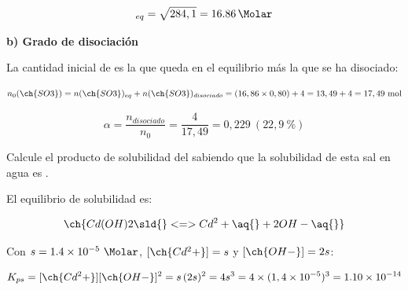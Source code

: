 \begin{exerciseEVAU}
\begin{solu}
        \begin{equation*}
            [\ch{SO3}]_{eq} = \sqrt{284,1} = \SI{16.86}{\Molar}
        \end{equation*}

        \textbf{b) Grado de disociación}

        La cantidad inicial de  es la que queda en el equilibrio más la que se ha disociado:

        \begin{equation*}
            n_0(\ch{SO3}) = n(\ch{SO3})_{eq} + n(\ch{SO3})_{disociado} = (16,86 \times 0,80) + 4 = 13,49 + 4 = 17,49 \ \text{mol}
        \end{equation*}

        \begin{equation*}
            \alpha = \dfrac{n_{disociado}}{n_0} = \dfrac{4}{17,49} = 0,229 \ (22,9\ \%)
        \end{equation*}

    \end{solu}

\end{exerciseEVAU}

\begin{exerciseEVAU}
    Calcule el producto de solubilidad del  sabiendo que la solubilidad de esta sal en agua es .


    \begin{solu}

        El equilibrio de solubilidad es:

        \begin{equation*}
            \ch{Cd(OH)2 \sld{} <=> Cd^2+ \aq{} + 2 OH- \aq{}}
        \end{equation*}

        Con \(s = \num{1.4e-5}\ \si{\Molar}\), \([\ch{Cd^2+}] = s\) y \([\ch{OH-}] = 2s\):

        \begin{equation*}
            K_{ps} = [\ch{Cd^2+}][\ch{OH-}]^2 = s\, (2s)^2 = 4 s^3 = 4 \times (1,4 \times 10^{-5})^3 = \num{1.10e-14}
        \end{equation*}

    \end{solu}


\end{exerciseEVAU}

